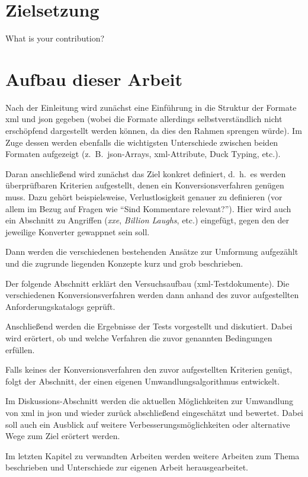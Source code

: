 \section{Zielsetzung}
What is your contribution?

\section{Aufbau dieser Arbeit}
\label{sec:structure}

Nach der Einleitung wird zunächst eine Einführung in die Struktur der
Formate \acrshort{xml} und \acrshort{json} gegeben (wobei die Formate allerdings selbstverständlich
nicht erschöpfend dargestellt werden können, da dies den Rahmen sprengen
würde). Im Zuge dessen werden ebenfalls die wichtigsten Unterschiede zwischen
beiden Formaten aufgezeigt (z.~B.\ \acrshort{json}-Arrays, \acrshort{xml}-Attribute, Duck Typing,
etc.).

Daran anschließend wird zunächst das Ziel konkret definiert, d.~h.\ es werden
überprüfbaren Kriterien aufgestellt, denen ein Konversionsverfahren genügen
muss. Dazu gehört beispielsweise, Verlustlosigkeit genauer zu definieren (vor
allem im Bezug auf Fragen wie \enquote{Sind Kommentare relevant?}). Hier wird
auch ein Abschnitt zu Angriffen (\emph{\gls{xxe}}, \emph{Billion Laughs}, etc.)
eingefügt, gegen den der jeweilige Konverter gewappnet sein soll.

Dann werden die verschiedenen bestehenden Ansätze zur Umformung aufgezählt
und die zugrunde liegenden Konzepte kurz und grob beschrieben.

Der folgende Abschnitt erklärt den Versuchsaufbau (\acrshort{xml}-Testdokumente).
Die verschiedenen Konversionsverfahren werden dann anhand des zuvor
aufgestellten Anforderungskatalogs geprüft.

Anschließend werden die Ergebnisse der Tests vorgestellt und diskutiert.
Dabei wird erörtert, ob und welche Verfahren die zuvor genannten Bedingungen
erfüllen.

Falls keines der Konversionsverfahren den zuvor aufgestellten Kriterien genügt,
folgt der Abschnitt, der einen eigenen Umwandlungsalgorithmus
entwickelt.

Im Diskussions-Abschnitt werden die aktuellen Möglichkeiten zur Umwandlung
von \acrshort{xml} in \acrshort{json} und wieder zurück abschließend eingeschätzt und bewertet.
Dabei soll auch ein Ausblick auf weitere Verbesserungsmöglichkeiten oder
alternative Wege zum Ziel erörtert werden.

Im letzten Kapitel zu verwandten Arbeiten werden weitere Arbeiten zum Thema
beschrieben und Unterschiede zur eigenen Arbeit herausgearbeitet.
